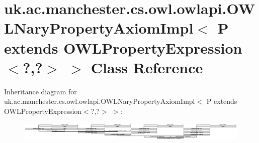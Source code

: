 \hypertarget{classuk_1_1ac_1_1manchester_1_1cs_1_1owl_1_1owlapi_1_1_o_w_l_nary_property_axiom_impl_3_01_p_01ebb131bf5bfcb769e964dbdcf75a7ae4d}{\section{uk.\-ac.\-manchester.\-cs.\-owl.\-owlapi.\-O\-W\-L\-Nary\-Property\-Axiom\-Impl$<$ P extends O\-W\-L\-Property\-Expression$<$?,?$>$ $>$ Class Reference}
\label{classuk_1_1ac_1_1manchester_1_1cs_1_1owl_1_1owlapi_1_1_o_w_l_nary_property_axiom_impl_3_01_p_01ebb131bf5bfcb769e964dbdcf75a7ae4d}
}
Inheritance diagram for uk.\-ac.\-manchester.\-cs.\-owl.\-owlapi.\-O\-W\-L\-Nary\-Property\-Axiom\-Impl$<$ P extends O\-W\-L\-Property\-Expression$<$?,?$>$ $>$\-:\begin{figure}[H]
\begin{center}
\leavevmode
\includegraphics[height=0.901771cm]{classuk_1_1ac_1_1manchester_1_1cs_1_1owl_1_1owlapi_1_1_o_w_l_nary_property_axiom_impl_3_01_p_01ebb131bf5bfcb769e964dbdcf75a7ae4d}
\end{center}
\end{figure}
